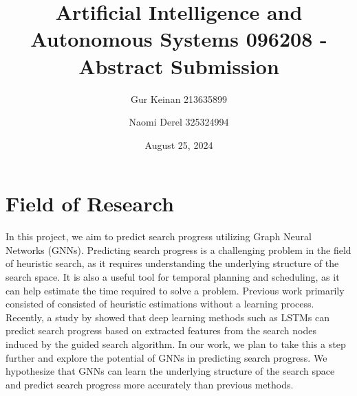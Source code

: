 \documentclass[11pt]{article}
\title{Artificial Intelligence and Autonomous Systems 096208 - Abstract Submission}
\author{Gur Keinan 213635899 \and Naomi Derel 325324994}
\date{August 25, 2024}
\begin{document}
\maketitle



\section{Field of Research}
In this project, we aim to predict search progress utilizing Graph Neural Networks (GNNs). Predicting search progress is a challenging problem in the field of heuristic search, as it requires understanding the underlying structure of the search space. It is also a useful tool for temporal planning and scheduling, as it can help estimate the time required to solve a problem. Previous work primarily consisted of consisted of heuristic estimations without a learning process. Recently, a study by \citet{sudry2022learning} showed that deep learning methods such as LSTMs can predict search progress based on extracted features from the search nodes induced by the guided search algorithm. In our work, we plan to take this a step further and explore the potential of GNNs in predicting search progress. We hypothesize that GNNs can learn the underlying structure of the search space and predict search progress more accurately than previous methods. 



\end{document}
